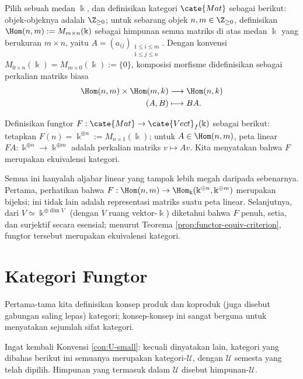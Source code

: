 \begin{example}
	Pilih sebuah medan $\Bbbk$, dan definisikan kategori $\cate{Mat}$ sebagai berikut: objek-objeknya adalah $\Z_{\geq 0}$; untuk sebarang objek $n, m \in \Z_{\geq 0}$, definisikan $\Hom(n, m) := M_{m \times n}(\Bbbk)$ sebagai himpunan semua matriks di atas medan $\Bbbk$ yang berukuran $m \times n$, yaitu $A = (a_{ij})_{\substack{1 \leq i \leq m \\ 1 \leq j \leq n}}$. Dengan konvensi $M_{0 \times n}(\Bbbk) = M_{m \times 0}(\Bbbk) := \{0\}$, komposisi morfisme didefinisikan sebagai perkalian matriks biasa
	\begin{align*}
		\Hom(n, m) \times \Hom(m, k) & \longrightarrow \Hom(n, k) \\
		(A, B) & \longmapsto BA .
	\end{align*}

	Definisikan fungtor $F: \cate{Mat} \to \cate{Vect}_f(\Bbbk)$ sebagai berikut: tetapkan $F(n) = \Bbbk^{\oplus n} := M_{n \times 1}(\Bbbk)$; untuk $A \in \Hom(n, m)$, peta linear $FA: \Bbbk^{\oplus n} \to \Bbbk^{\oplus m}$ adalah perkalian matriks $v \mapsto Av$. Kita menyatakan bahwa $F$ merupakan ekuivalensi kategori.

	Semua ini hanyalah aljabar linear yang tampak lebih megah daripada sebenarnya. Pertama, perhatikan bahwa $F: \Hom(n, m) \to \Hom_\Bbbk(\Bbbk^{\oplus n}, \Bbbk^{\oplus m})$ merupakan bijeksi; ini tidak lain adalah representasi matriks suatu peta linear. Selanjutnya, dari $V \simeq \Bbbk^{\oplus \dim V}$ (dengan $V$ ruang vektor-$\Bbbk$) diketahui bahwa $F$ penuh, setia, dan surjektif secara esensial; menurut Teorema \ref{prop:functor-equiv-criterion}, fungtor tersebut merupakan ekuivalensi kategori.
\end{example}

\section{Kategori Fungtor}\label{sec:functor-category}
Pertama-tama kita definisikan konsep produk dan koproduk (juga disebut gabungan saling lepas) kategori; konsep-konsep ini sangat berguna untuk menyatakan sejumlah sifat kategori.

Ingat kembali Konvensi \ref{con:U-small}: kecuali dinyatakan lain, kategori yang dibahas berikut ini semuanya merupakan kategori-$\mathcal{U}$, dengan $\mathcal{U}$ semesta yang telah dipilih. Himpunan yang termasuk dalam $\mathcal{U}$ disebut himpunan-$\mathcal{U}$.

